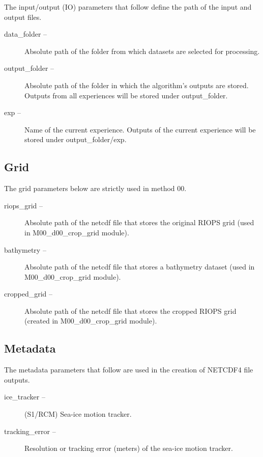 \documentclass[draft]{agujournal2018}
\begin{document}
The input/output (IO) parameters that follow define the path of the input and output files.

\begin{description}
\item[data\_folder --] Absolute path of the folder from which datasets are selected for processing.

\item[output\_folder --] Absolute path of the folder in which the algorithm's outputs are stored. Outputs from all experiences will be stored under output\_folder.

\item[exp --] Name of the current experience. Outputs of the current experience will be stored under output\_folder/exp.
\end{description}

\subsection{Grid}

The grid parameters below are strictly used in method 00. 

\begin{description}
\item[riops\_grid --] Absolute path of the netcdf file that stores the original RIOPS grid (used in M00\_d00\_crop\_grid module).

\item[bathymetry --]  Absolute path of the netcdf file that stores a bathymetry dataset (used in M00\_d00\_crop\_grid module).

\item[cropped\_grid --] Absolute path of the netcdf file that stores the cropped RIOPS grid (created in M00\_d00\_crop\_grid module).

\end{description}

\subsection{Metadata}

The metadata parameters that follow are used in the creation of NETCDF4 file outputs.

\begin{description}

\item[ice\_tracker --] (S1/RCM) Sea-ice motion tracker.
 
\item[tracking\_error --] Resolution or tracking error (meters) of the sea-ice motion tracker.

\end{description}
\end{document}

